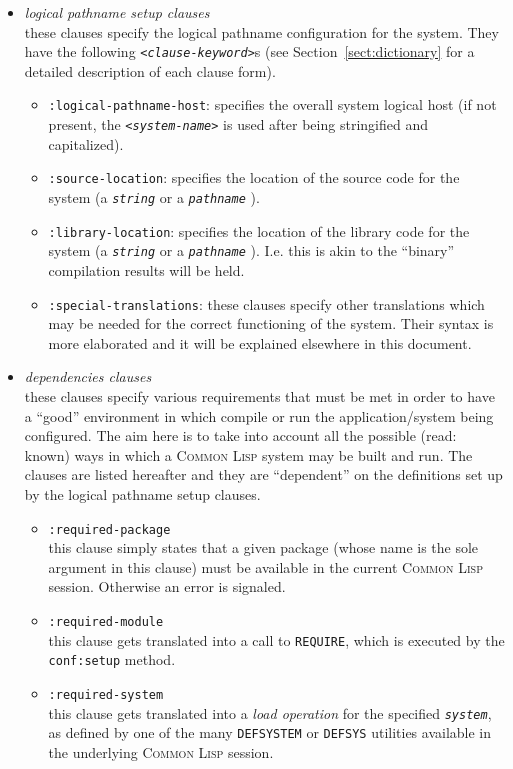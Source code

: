 \documentclass[a4paper]{article}
\newcommand{\CL}{\textsc{Common Lisp}}
\newcommand{\notimpl}{\ddag}
\newcommand{\code}[1]{\texttt{#1}}
\newcommand{\clobject}[1]{\texttt{\textit{#1}}} %
\begin{document}
\begin{itemize}
\item	\emph{logical pathname setup clauses}\\
	these clauses specify the logical pathname configuration for
	the system. They have the following
	\code{\emph{<clause-keyword>}}s (see Section~\ref{sect:dictionary} for
	a detailed description of each clause form).
	\begin{itemize}
	\item	\code{:logical-pathname-host}: specifies the overall
		system logical host (if not present, the
		\code{\emph{<system-name>}} is used after being
		stringified and capitalized).

	\item	\code{:source-location}: specifies the location of the
		source code for the system (a \clobject{string} or a
		\clobject{pathname} \notimpl{}).

	\item	\code{:library-location}: specifies the location of the
		library code for the system (a \clobject{string} or a
		\clobject{pathname} \notimpl{}). I.e. this is akin to
		the ``binary'' compilation results will be held.

	\item	\code{:special-translations}: these clauses specify
		other translations which may be needed for the
		correct functioning of the system.  Their syntax is
		more elaborated and it will be explained elsewhere in
		this document.
	\end{itemize}

\item	\emph{dependencies clauses}\\
	these clauses specify various requirements that must be met in
	order to have a ``good'' environment in which compile or run
	the application/system being configured.  The aim here is to
	take into account all the possible (read: known) ways in which
	a \CL{} system may be built and run.  The clauses are listed
	hereafter and they are ``dependent'' on the definitions set up
	by the logical pathname setup clauses.
	\begin{itemize}
	\item	\code{:required-package}\\
		this clause simply states that a given package (whose
		name is the sole argument in this clause) must be
		available in the current \CL{} session.  Otherwise an
		error is signaled.

	\item	\code{:required-module}\\
		this clause gets translated into a call to
		\code{REQUIRE}, which is executed by the
		\code{conf:setup} method.

	\item	\code{:required-system}\\
		this clause gets translated into a \emph{load
		operation} for the specified \clobject{system}, as
		defined by one of the many \code{DEFSYSTEM} or
		\code{DEFSYS} utilities available in the underlying
		\CL{} session.
	\end{itemize}

\end{itemize}
\end{document}
